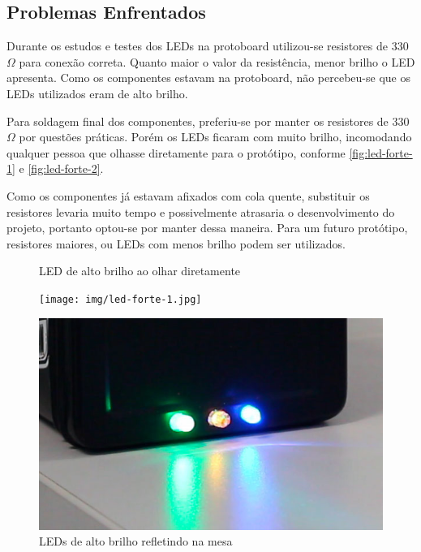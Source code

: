 \documentclass[
		12pt,				%
		openright,			%
		oneside,			%
		a4paper,			%
		chapter=TITLE,		%
		english,			%
		brazil				%
	]{abntex2}
\begin{document}
\subsection{Problemas Enfrentados}\label{sec:problemas-enfrentados}

Durante os estudos e testes dos LEDs na protoboard utilizou-se resistores de 330$\Omega$ para conexão correta. Quanto maior o valor da resistência, menor brilho o LED apresenta. Como os componentes estavam na protoboard, não percebeu-se que os LEDs utilizados eram de alto brilho.

Para soldagem final dos componentes, preferiu-se por manter os resistores de 330$\Omega$ por questões práticas. Porém os LEDs ficaram com muito brilho, incomodando qualquer pessoa que olhasse diretamente para o protótipo, conforme \autoref{fig:led-forte-1} e \autoref{fig:led-forte-2}.

Como os componentes já estavam afixados com cola quente, substituir os resistores levaria muito tempo e possivelmente atrasaria o desenvolvimento do projeto, portanto optou-se por manter dessa maneira. Para um futuro protótipo, resistores maiores, ou LEDs com menos brilho podem ser utilizados.

\begin{figure}[htb]
	\centering
 	\begin{minipage}{0.45\textwidth}
		\centering
		\caption{\label{fig:led-forte-1}LED de alto brilho ao olhar diretamente}
		\texttt{[image: img/led-forte-1.jpg]}
	\end{minipage}
	\hfill
	\begin{minipage}{0.45\textwidth}
		\centering
		\caption{\label{fig:led-forte-2}LEDs de alto brilho refletindo na mesa}
		\includegraphics[width=1\textwidth]{img/led-forte-2.jpg}
	\end{minipage}
\end{figure}
\end{document}
